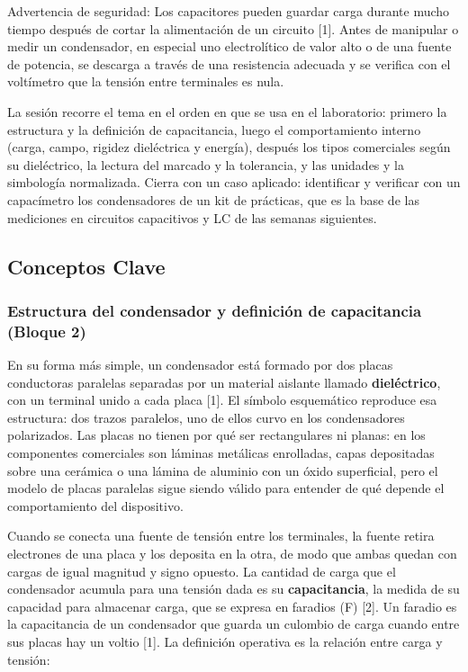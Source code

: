 \documentclass[11pt,letterpaper]{article}
\begin{document}
\begin{nota}{Advertencia de seguridad:}
Los capacitores pueden guardar carga durante mucho tiempo después de cortar la alimentación de un circuito [1]. Antes de manipular o medir un condensador, en especial uno electrolítico de valor alto o de una fuente de potencia, se descarga a través de una resistencia adecuada y se verifica con el voltímetro que la tensión entre terminales es nula.
\end{nota}

La sesión recorre el tema en el orden en que se usa en el laboratorio: primero la estructura y la definición de capacitancia, luego el comportamiento interno (carga, campo, rigidez dieléctrica y energía), después los tipos comerciales según su dieléctrico, la lectura del marcado y la tolerancia, y las unidades y la simbología normalizada. Cierra con un caso aplicado: identificar y verificar con un capacímetro los condensadores de un kit de prácticas, que es la base de las mediciones en circuitos capacitivos y LC de las semanas siguientes.

\subsection{Conceptos Clave}

\subsubsection{Estructura del condensador y definición de capacitancia (Bloque 2)}

En su forma más simple, un condensador está formado por dos placas conductoras paralelas separadas por un material aislante llamado \textbf{dieléctrico}, con un terminal unido a cada placa [1]. El símbolo esquemático reproduce esa estructura: dos trazos paralelos, uno de ellos curvo en los condensadores polarizados. Las placas no tienen por qué ser rectangulares ni planas: en los componentes comerciales son láminas metálicas enrolladas, capas depositadas sobre una cerámica o una lámina de aluminio con un óxido superficial, pero el modelo de placas paralelas sigue siendo válido para entender de qué depende el comportamiento del dispositivo.

Cuando se conecta una fuente de tensión entre los terminales, la fuente retira electrones de una placa y los deposita en la otra, de modo que ambas quedan con cargas de igual magnitud y signo opuesto. La cantidad de carga que el condensador acumula para una tensión dada es su \textbf{capacitancia}, la medida de su capacidad para almacenar carga, que se expresa en faradios (F) [2]. Un faradio es la capacitancia de un condensador que guarda un culombio de carga cuando entre sus placas hay un voltio [1]. La definición operativa es la relación entre carga y tensión:
\end{document}
